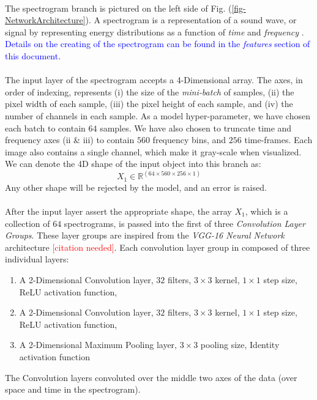 \documentclass[12pt,letterpaper]{article}
\begin{document}
\paragraph*{}The spectrogram branch is pictured on the left side of Fig. (\ref{fig-NetworkArchitecture}). A spectrogram is a representation of a sound wave, or signal by representing energy distributions as a function of \textit{time} and \textit{frequency} \cite{White,Olson,Kahn}. \textcolor{blue}{Details on the creating of the spectrogram can be found in the \textit{features} section of this document.}

\paragraph*{}The input layer of the spectrogram accepts a 4-Dimensional array. The axes, in order of indexing, represents (i) the size of the \textit{mini-batch} of samples, (ii) the pixel width of each sample, (iii) the pixel height of each sample, and (iv) the number of channels in each sample. As a model hyper-parameter, we have chosen each batch to contain $64$ samples. We have also chosen to truncate time and frequency axes (ii \& iii) to contain $560$ frequency bins, and $256$ time-frames. Each image also contains a single channel, which make it gray-scale when visualized. We can denote the 4D shape of the input object into this branch as:
\begin{equation}
\label{eqn-shapeX1}
X_1 \in \mathbb{R}^{(64 \times 560 \times 256 \times 1)}
\end{equation}
Any other shape will be rejected by the model, and an error is raised.

\paragraph*{}After the input layer assert the appropriate shape, the array $X_1$, which is a collection of $64$ spectrograms, is passed into the first of three \textit{Convolution Layer Groups}. These layer groups are inspired from the \textit{VGG-16 Neural Network} architecture \textcolor{red}{[citation needed]}. Each convolution layer group in composed of three individual layers: 
\begin{enumerate}
\item A 2-Dimensional Convolution layer, $32$ filters, $3 \times 3$ kernel, $1 \times 1$ step size, ReLU activation function,
\item A 2-Dimensional Convolution layer, $32$ filters, $3 \times 3$ kernel, $1 \times 1$ step size, ReLU activation function,
\item A 2-Dimensional Maximum Pooling layer, $3 \times 3$ pooling size, Identity activation function
\end{enumerate}  
The Convolution layers convoluted over the middle two axes of the data (over space and time in the spectrogram). 
\end{document}
